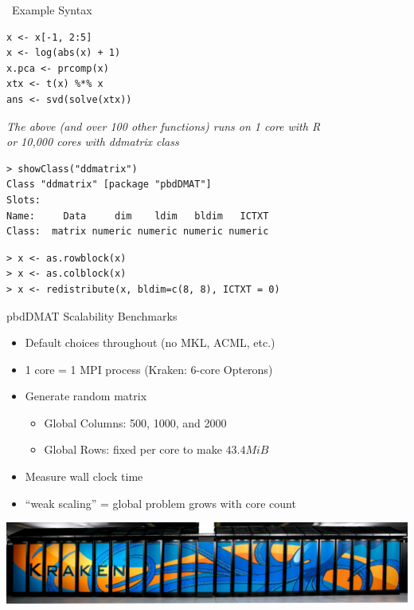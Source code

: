 \begin{frame}[fragile]
  \begin{block}{\pbdR\ Example Syntax}
\vspace{-2ex}
  \begin{lstlisting}
x <- x[-1, 2:5]
x <- log(abs(x) + 1)
x.pca <- prcomp(x)
xtx <- t(x) %*% x
ans <- svd(solve(xtx))
  \end{lstlisting}
\vspace{-1ex}
  \begin{center}
  \emph{The above (and over 100 other functions) runs on 1 core with R \\
    or 10,000 cores with \pbdR ddmatrix class}
  \end{center}
\vspace{-2ex}
\begin{lstlisting}
> showClass("ddmatrix")
Class "ddmatrix" [package "pbdDMAT"]
Slots:
Name:     Data     dim    ldim   bldim   ICTXT
Class:  matrix numeric numeric numeric numeric
\end{lstlisting}
\vspace{-2ex}
\begin{lstlisting}
> x <- as.rowblock(x)
> x <- as.colblock(x)
> x <- redistribute(x, bldim=c(8, 8), ICTXT = 0)
\end{lstlisting}
  \end{block}
\end{frame}

\begin{frame}
  \begin{block}{pbdDMAT Scalability Benchmarks}
    \begin{itemize}[<+-|alert@+>]
      \item Default choices throughout (no MKL, ACML, etc.)
      \item 1 core = 1 MPI process (Kraken: 6-core Opterons)
      \item Generate random matrix
        \begin{itemize}
        \item Global Columns: 500, 1000, and 2000
        \item Global Rows: fixed per core to make $43.4 MiB$
        \end{itemize}
      \item Measure wall clock time
      \item ``weak scaling'' = global problem grows with core count
    \end{itemize}
    \vspace{.8cm}
    \centering\includegraphics{../common/pics/krakenWide}
  \end{block}
\end{frame}

